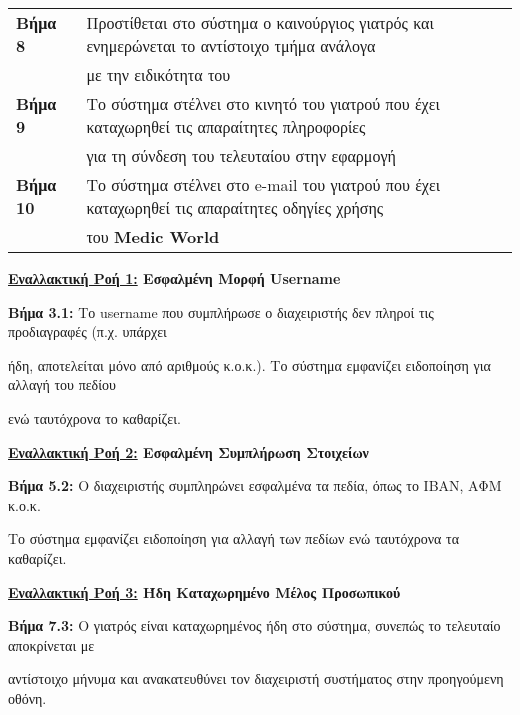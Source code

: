 \documentclass{article}
\newcommand\T{\rule{0pt}{2.6ex}}       %
\newcommand\B{\rule[-1.2ex]{0pt}{0pt}}
\begin{document}
\begin{center}
\begin{tabular}{|l|l|}
      \hline
      \textbf{Βήμα 8} & Προστίθεται στο σύστημα ο καινούργιος γιατρός και ενημερώνεται το αντίστοιχο τμήμα ανάλογα \T \\& με την ειδικότητα του \B \\
      \hline
      \textbf{Βήμα 9} &  Το σύστημα στέλνει στο κινητό του γιατρού που έχει καταχωρηθεί τις απαραίτητες πληροφορίες \T \\& για τη σύνδεση του τελευταίου στην εφαρμογή \B \\
      \hline
      \textbf{Βήμα 10} &  Το σύστημα στέλνει στο e-mail του γιατρού που έχει καταχωρηθεί τις απαραίτητες οδηγίες χρήσης \T \\& του \textbf{Medic World} \B \\
      \hline
     \end{tabular}
\end{center}

\textbf{\underline{Εναλλακτική Ροή 1:} Εσφαλμένη Μορφή Username} \vspace{0.2cm}
\par \textbf{Βήμα 3.1:} Το username που συμπλήρωσε ο διαχειριστής δεν πληροί τις προδιαγραφές (π.χ. υπάρχει \par ήδη, αποτελείται μόνο από αριθμούς κ.ο.κ.). Το σύστημα εμφανίζει ειδοποίηση για αλλαγή του πεδίου \par ενώ ταυτόχρονα το καθαρίζει.\vspace{0.2cm}

\textbf{\underline{Εναλλακτική Ροή 2:} Εσφαλμένη Συμπλήρωση Στοιχείων} \vspace{0.2cm}
\par \textbf{Βήμα 5.2:} Ο διαχειριστής συμπληρώνει εσφαλμένα τα πεδία, όπως το ΙΒΑΝ, ΑΦΜ κ.ο.κ. \par Το σύστημα εμφανίζει ειδοποίηση για αλλαγή των πεδίων ενώ ταυτόχρονα τα καθαρίζει.\vspace{0.2cm}

\textbf{\underline{Εναλλακτική Ροή 3:} Ήδη Καταχωρημένο Μέλος Προσωπικού} \vspace{0.2cm}
\par \textbf{Βήμα 7.3:} Ο γιατρός είναι καταχωρημένος ήδη στο σύστημα, συνεπώς το τελευταίο αποκρίνεται με \par αντίστοιχο μήνυμα και ανακατευθύνει τον διαχειριστή συστήματος στην προηγούμενη οθόνη. 

 
\end{document}
